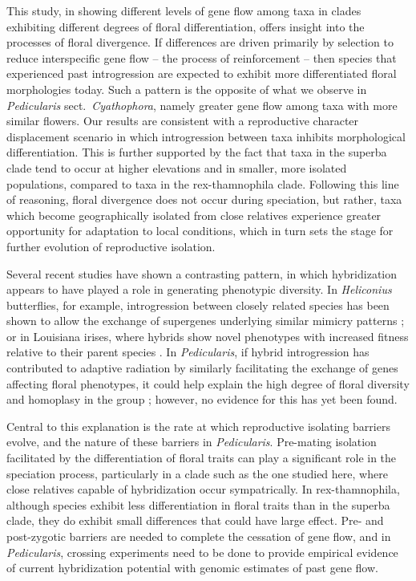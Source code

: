 \documentclass[12pt,letterpaper]{article}
\begin{document}
This study, in showing different levels of gene flow among taxa in
clades exhibiting different degrees of floral differentiation, offers
insight into the processes of floral divergence. If differences are
driven primarily by selection to reduce interspecific gene flow -- the
process of reinforcement \citep{hopkins_pollinator-mediated_2012,
  servedio_role_2003} -- then species that experienced past
introgression are expected to exhibit more differentiated floral
morphologies today.
Such a pattern is the opposite of what we observe in
\emph{Pedicularis} sect.\ \emph{Cyathophora}, namely greater gene flow
among taxa with more similar flowers.  Our results are consistent with
a reproductive character displacement scenario in which introgression
between taxa inhibits morphological differentiation.  This is further
supported by the fact that taxa in the superba clade tend to occur at
higher elevations and in smaller, more isolated populations, compared
to taxa in the rex-thamnophila clade.  Following this line of
reasoning, floral divergence does not occur during speciation, but
rather, taxa which become geographically isolated from close relatives
experience greater opportunity for adaptation to local conditions,
which in turn sets the stage for further evolution of reproductive
isolation.

Several recent studies have shown a contrasting pattern, in which
hybridization appears to have played a role in generating phenotypic
diversity.  In \emph{Heliconius} butterflies, for example,
introgression between closely related species has been shown
to allow the exchange of supergenes underlying similar mimicry patterns
\citep{the_heliconius_genome_consortium_butterfly_2012}; or in
Louisiana irises, where hybrids show novel phenotypes with increased
fitness relative to their parent species \citep{arnold_hybrid_2012}.
In \emph{Pedicularis}, if hybrid introgression has contributed to
adaptive radiation by similarly facilitating the exchange of genes
affecting floral phenotypes, it could help explain the high degree of
floral diversity and homoplasy in the group
\citep{ree_phylogeny_2005}; however, no evidence for this has yet been
found.

Central to this explanation is the rate at which reproductive
isolating barriers evolve, and the nature of these barriers in
\emph{Pedicularis}. Pre-mating isolation facilitated by the
differentiation of floral traits can play a significant role in the
speciation process, particularly in a clade such as the one studied
here, where close relatives capable of hybridization occur
sympatrically. In rex-thamnophila, although species exhibit less
differentiation in floral traits than in the superba clade, they do
exhibit small differences that could have large effect. Pre- and
post-zygotic barriers are needed to complete the cessation of gene
flow, and in \emph{Pedicularis}, crossing experiments need to be done
to provide empirical evidence of current hybridization potential with
genomic estimates of past gene flow.
\end{document}
